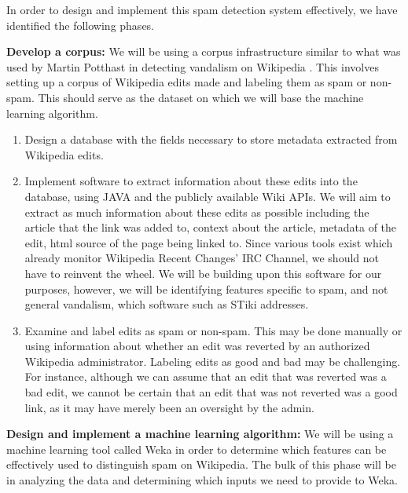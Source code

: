 \documentclass[letterpaper]{sig-alternate}
\begin{document}
In order to design and implement this spam detection system effectively, we have identified the following phases.

\textbf{Develop a corpus:} We will be using a corpus infrastructure similar to what was used by Martin Potthast in detecting vandalism on Wikipedia \cite{potthast_auto_vandal}. This involves setting up a corpus of Wikipedia edits made and labeling them as spam or non-spam. This should serve as the dataset on which we will base the machine learning algorithm. 

\begin{enumerate}
\item Design a database with the fields necessary to store metadata extracted from Wikipedia edits. 

\item Implement software to extract information about these edits into the database, using JAVA and the publicly available Wiki APIs. We will aim to extract as much information about these edits as possible including the article that the link was added to, context about the article, metadata of the edit, html source of the page being linked to. Since various tools exist which already monitor Wikipedia Recent Changes' IRC Channel, we should not have to reinvent the wheel. We will be building upon this software for our purposes, however, we will be identifying features specific to spam, and not general vandalism, which software such as STiki addresses.

\item Examine and label edits as spam or non-spam. This may be done manually or using information about whether an edit was reverted by an authorized Wikipedia administrator. Labeling edits as good and bad may be challenging. For instance, although we can assume that an edit that was reverted was a bad edit, we cannot be certain that an edit that was not reverted was a good link, as it may have merely been an oversight by the admin.
\end{enumerate}

\textbf{Design and implement a machine learning algorithm:} We will be using a machine learning tool called Weka in order to determine which features can be effectively used to distinguish spam on Wikipedia. The bulk of this phase will be in analyzing the data and determining which inputs we need to provide to Weka.
\end{document}
